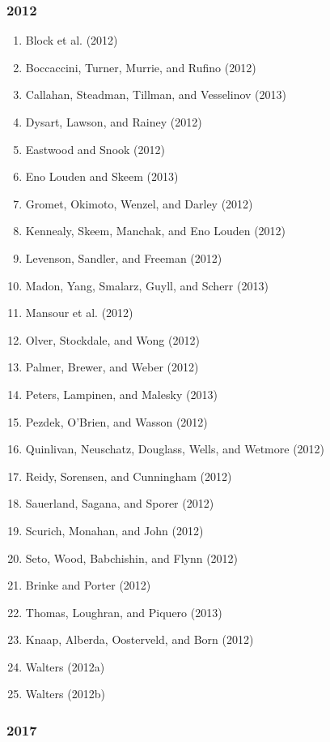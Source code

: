 \documentclass[english,man]{apa6}
\providecommand{\tightlist}{%
  \setlength{\itemsep}{0pt}\setlength{\parskip}{0pt}}
\begin{document}
\subsubsection{2012}\label{section-24}

\begin{enumerate}
\def\labelenumi{\arabic{enumi})}
\tightlist
\item
  Block et al. (2012)
\item
  Boccaccini, Turner, Murrie, and Rufino (2012)
\item
  Callahan, Steadman, Tillman, and Vesselinov (2013)
\item
  Dysart, Lawson, and Rainey (2012)
\item
  Eastwood and Snook (2012)
\item
  Eno Louden and Skeem (2013)
\item
  Gromet, Okimoto, Wenzel, and Darley (2012)
\item
  Kennealy, Skeem, Manchak, and Eno Louden (2012)
\item
  Levenson, Sandler, and Freeman (2012)
\item
  Madon, Yang, Smalarz, Guyll, and Scherr (2013)
\item
  Mansour et al. (2012)
\item
  Olver, Stockdale, and Wong (2012)
\item
  Palmer, Brewer, and Weber (2012)
\item
  Peters, Lampinen, and Malesky (2013)
\item
  Pezdek, O'Brien, and Wasson (2012)
\item
  Quinlivan, Neuschatz, Douglass, Wells, and Wetmore (2012)
\item
  Reidy, Sorensen, and Cunningham (2012)
\item
  Sauerland, Sagana, and Sporer (2012)
\item
  Scurich, Monahan, and John (2012)
\item
  Seto, Wood, Babchishin, and Flynn (2012)
\item
  Brinke and Porter (2012)
\item
  Thomas, Loughran, and Piquero (2013)
\item
  Knaap, Alberda, Oosterveld, and Born (2012)
\item
  Walters (2012a)
\item
  Walters (2012b)
\end{enumerate}

\subsubsection{2017}\label{section-25}
\end{document}
